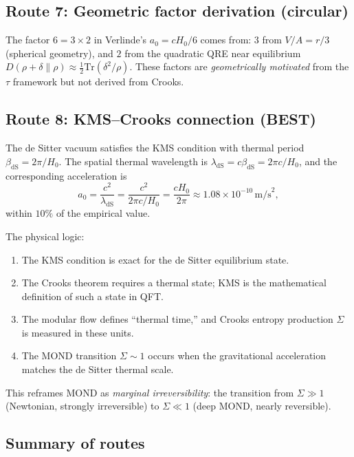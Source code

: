 \documentclass[aps,prd,preprint,superscriptaddress,longbibliography]{revtex4-2}
\newcommand{\Tr}{\mathrm{Tr}}
\newcommand{\KL}{D}
\newcommand{\tauasym}{\tau}
\newcommand{\azero}{a_0}
\begin{document}
\subsection{Route 7: Geometric factor derivation (circular)}

The factor $6 = 3\times 2$ in Verlinde's $\azero = cH_0/6$ comes
from: $3$ from $V/A = r/3$ (spherical geometry), and $2$ from the
quadratic QRE near equilibrium $\KL(\rho+\delta\|\rho) \approx
\tfrac{1}{2}\Tr(\delta^2/\rho)$.  These factors are
\emph{geometrically motivated} from the $\tauasym$ framework but not
derived from Crooks.

\subsection{Route 8: KMS--Crooks connection (BEST)}

The de Sitter vacuum satisfies the KMS condition with thermal
period $\beta_{\mathrm{dS}} = 2\pi/H_0$.  The spatial thermal
wavelength is $\lambda_{\mathrm{dS}} = c\beta_{\mathrm{dS}}
= 2\pi c/H_0$, and the corresponding acceleration is
\begin{equation}
\azero = \frac{c^2}{\lambda_{\mathrm{dS}}}
= \frac{c^2}{2\pi c/H_0} = \frac{cH_0}{2\pi}
\approx 1.08\times 10^{-10}\,\mathrm{m/s}^2,
\label{eq:a0_KMS}
\end{equation}
within $10\%$ of the empirical value.

The physical logic:
\begin{enumerate}
\item The KMS condition is exact for the de Sitter equilibrium state.
\item The Crooks theorem requires a thermal state; KMS is the
  mathematical definition of such a state in QFT.
\item The modular flow defines ``thermal time,'' and Crooks entropy
  production $\Sigma$ is measured in these units.
\item The MOND transition $\Sigma\sim 1$ occurs when the
  gravitational acceleration matches the de Sitter thermal scale.
\end{enumerate}

This reframes MOND as \emph{marginal irreversibility}: the transition
from $\Sigma \gg 1$ (Newtonian, strongly irreversible) to $\Sigma\ll 1$
(deep MOND, nearly reversible).

\subsection{Summary of routes}
\end{document}
